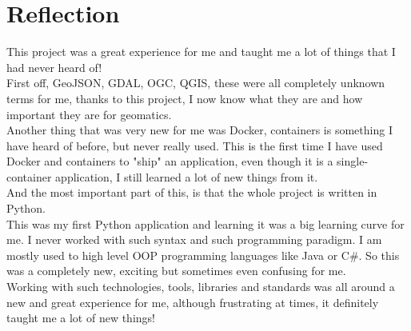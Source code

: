 \section{Reflection}
This project was a great experience for me and taught me a lot of things that I had never heard of!\\
First off, GeoJSON, GDAL, OGC, QGIS, these were all completely unknown terms for me, thanks to this project, I now know what they are and how important they are for geomatics.\\
\newline
Another thing that was very new for me was Docker, containers is something I have heard of before, but never really used. This is the first time I have used Docker and containers to "ship" an application, even though it is a single-container application, I still learned a lot of new things from it.\\
\newline
And the most important part of this, is that the whole project is written in Python.\\
This was my first Python application and learning it was a big learning curve for me. I never worked with such syntax and such programming paradigm. I am mostly used to high level OOP programming languages like Java or C\#. So this was a completely new, exciting but sometimes even confusing for me.\\
\newline
Working with such technologies, tools, libraries and standards was all around a new and great experience for me, although frustrating at times, it definitely taught me a lot of new things!